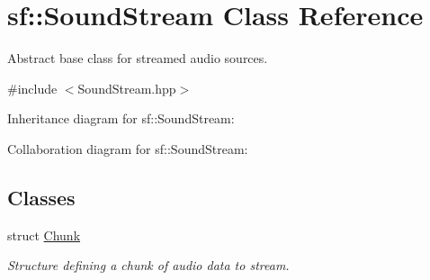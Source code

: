\hypertarget{classsf_1_1_sound_stream}{}\section{sf\+:\+:Sound\+Stream Class Reference}
\label{classsf_1_1_sound_stream}


Abstract base class for streamed audio sources.  




{\ttfamily \#include $<$Sound\+Stream.\+hpp$>$}



Inheritance diagram for sf\+:\+:Sound\+Stream\+:


Collaboration diagram for sf\+:\+:Sound\+Stream\+:
\subsection*{Classes}
\begin{DoxyCompactItemize}
\item 
struct \hyperlink{structsf_1_1_sound_stream_1_1_chunk}{Chunk}
\begin{DoxyCompactList}\small\item\em Structure defining a chunk of audio data to stream. \end{DoxyCompactList}\end{DoxyCompactItemize}
